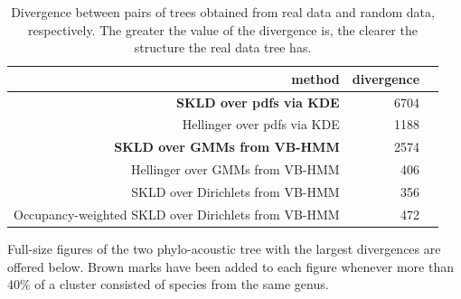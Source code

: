 \documentclass[pdftex,11pt,a4paper]{article}
\theoremstyle{definition}
\theoremstyle{remark}
\begin{document}
\begin{table}[t]
\begin{tabular}{r|r|r}
     \textbf{method} &\textbf{divergence}\\
     \hline
     \textbf{SKLD over pdfs via KDE} & 6704\\
     Hellinger over pdfs via KDE & 1188\\
     \textbf{SKLD over GMMs from VB-HMM} & 2574\\
     Hellinger over GMMs from VB-HMM & 406\\
     SKLD over Dirichlets from VB-HMM & 356\\
     Occupancy-weighted SKLD over Dirichlets from VB-HMM & 472
\end{tabular} 
\caption{Divergence between pairs of trees obtained from real data and random data, respectively. The greater the value of the divergence is, the clearer the structure the real data tree has.} \label{tab1}
\end{table}

\par Full-size figures of the two phylo-acoustic tree with the largest divergences are offered below. Brown marks have been added to each figure whenever more than 40\% of a cluster consisted of species from the same genus.
\end{document}
